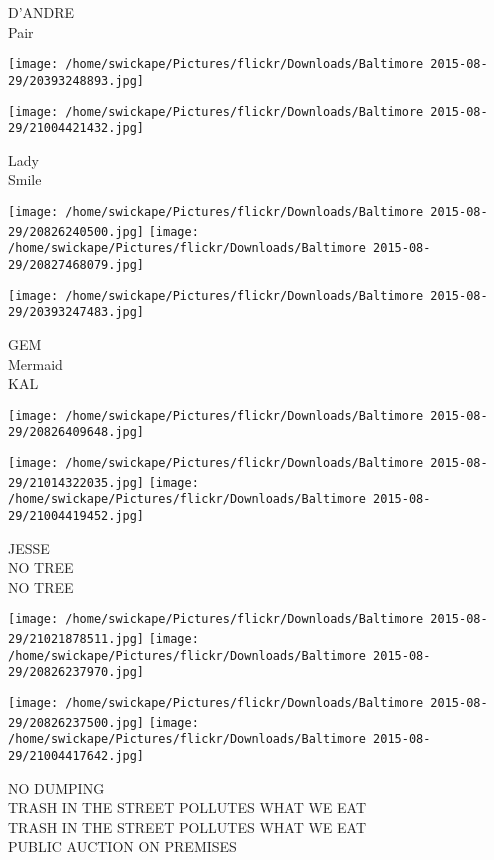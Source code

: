 \documentclass[10pt,letterpaper]{article}
\begin{document}
D'ANDRE\\
Pair
\pagebreak

\texttt{[image: /home/swickape/Pictures/flickr/Downloads/Baltimore 2015-08-29/20393248893.jpg]}

\vspace{0.25in}
\texttt{[image: /home/swickape/Pictures/flickr/Downloads/Baltimore 2015-08-29/21004421432.jpg]}

Lady\\
Smile
\pagebreak

\texttt{[image: /home/swickape/Pictures/flickr/Downloads/Baltimore 2015-08-29/20826240500.jpg]}
\texttt{[image: /home/swickape/Pictures/flickr/Downloads/Baltimore 2015-08-29/20827468079.jpg]}

\texttt{[image: /home/swickape/Pictures/flickr/Downloads/Baltimore 2015-08-29/20393247483.jpg]}

GEM\\
Mermaid\\
KAL
\pagebreak

\texttt{[image: /home/swickape/Pictures/flickr/Downloads/Baltimore 2015-08-29/20826409648.jpg]}

\vspace{0.25in}
\texttt{[image: /home/swickape/Pictures/flickr/Downloads/Baltimore 2015-08-29/21014322035.jpg]}
\texttt{[image: /home/swickape/Pictures/flickr/Downloads/Baltimore 2015-08-29/21004419452.jpg]}

JESSE\\
NO TREE\\
NO TREE
\pagebreak

\texttt{[image: /home/swickape/Pictures/flickr/Downloads/Baltimore 2015-08-29/21021878511.jpg]}
\texttt{[image: /home/swickape/Pictures/flickr/Downloads/Baltimore 2015-08-29/20826237970.jpg]}

\texttt{[image: /home/swickape/Pictures/flickr/Downloads/Baltimore 2015-08-29/20826237500.jpg]}
\texttt{[image: /home/swickape/Pictures/flickr/Downloads/Baltimore 2015-08-29/21004417642.jpg]}

NO DUMPING\\
TRASH IN THE STREET POLLUTES WHAT WE EAT\\
TRASH IN THE STREET POLLUTES WHAT WE EAT\\
PUBLIC AUCTION ON PREMISES
\pagebreak
\end{document}
